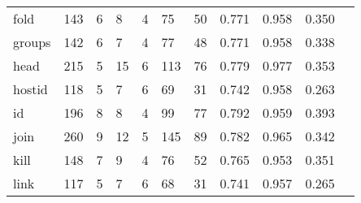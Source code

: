 \begin{longtable}{lp{1.10cm}p{1.10cm}p{1.10cm}p{1.10cm}p{1.10cm}p{1.10cm}p{1.10cm}p{1.10cm}p{1.10cm}p{1.10cm}}
fold      &                    143 &                                  6 &                                 8 &                                4 &                                75 &                              50 &                             0.771 &                                 0.958 &                               0.350 \\
groups    &                    142 &                                  6 &                                 7 &                                4 &                                77 &                              48 &                             0.771 &                                 0.958 &                               0.338 \\
head      &                    215 &                                  5 &                                15 &                                6 &                               113 &                              76 &                             0.779 &                                 0.977 &                               0.353 \\
hostid    &                    118 &                                  5 &                                 7 &                                6 &                                69 &                              31 &                             0.742 &                                 0.958 &                               0.263 \\
id        &                    196 &                                  8 &                                 8 &                                4 &                                99 &                              77 &                             0.792 &                                 0.959 &                               0.393 \\
join      &                    260 &                                  9 &                                12 &                                5 &                               145 &                              89 &                             0.782 &                                 0.965 &                               0.342 \\
kill      &                    148 &                                  7 &                                 9 &                                4 &                                76 &                              52 &                             0.765 &                                 0.953 &                               0.351 \\
link      &                    117 &                                  5 &                                 7 &                                6 &                                68 &                              31 &                             0.741 &                                 0.957 &                               0.265 \\

\end{longtable}

